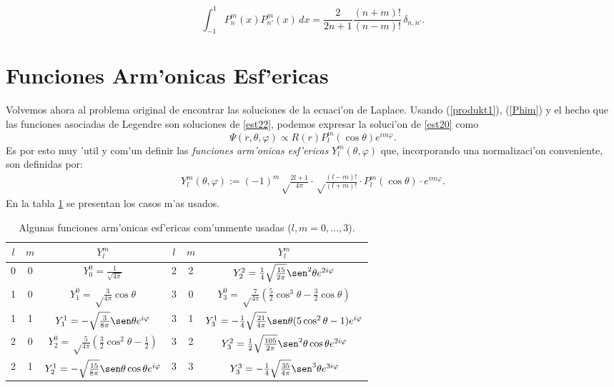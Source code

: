 \begin{equation}
\int_{-1}^{1}P_{n}^m(x)P_{n'}^m(x)\,dx=\frac{2}{2n+1}\frac{(n+m)!}{(n-m)!}\,\delta_{n,n'}.
\end{equation}



\section{Funciones Arm'onicas Esf'ericas}

 Volvemos ahora al problema original de encontrar las soluciones de la ecuaci'on
de Laplace. Usando (\ref{produkt1}), (\ref{Phim}) y el hecho que las funciones asociadas de Legendre son soluciones de \eqref{est22}, podemos expresar la soluci'on de \eqref{est20} como
 \begin{equation}
\Psi(r,\theta,\varphi)\propto R(r)P_l^m(\cos\theta)e^{im\varphi}.\label{est30}
 \end{equation}
Es por esto muy 'util y com'un definir las \textit{funciones arm'onicas
esf'ericas} $Y_l^m (\theta,\varphi)$ que, incorporando una normalizaci'on conveniente, son definidas por:
 \begin{eqnarray}
  Y_l^m (\theta,\varphi) := (-1)^m\sqrt\frac{2l+1}{4\pi}\cdot\sqrt\frac
   {(l-m)!}{(l+m)!}\cdot P_l^m(\cos\theta)\cdot e^{im\varphi}.\label{kugel1}
 \end{eqnarray}
  En la tabla \ref{tabelle1} se presentan los casos m'as usados.
\begin{table}[htbp]
\begin{tabular}{cc|c||cc|c}
  $l$ & $m$ & $Y_l^m $ & $l$ & $m$ & $Y_l^m $\\\hline
  0&0&$Y_0^0=\frac 1{\sqrt{4\pi}}$&2&2&$Y_2^2=\frac 14\sqrt\frac{15}{2\pi}
   \sen^2\theta e^{2i\varphi}$\\
  1&0&$Y_1^0=\sqrt\frac 3{4\pi}\cos\theta$&3&0&$Y_3^0=\sqrt\frac 7{4\pi}
  (\frac 52\cos^3\theta-\frac 32\cos\theta)$\\
  1&1&$Y_1^1=-\sqrt \frac 3{8\pi}\sen\theta e^{i\varphi}$&3&1&$Y_3^1=
  -\frac 14\sqrt\frac{21}{4\pi}\sen\theta(5\cos^2\theta-1)e^{i\varphi}$\\
  2&0&$Y_2^0=\sqrt\frac 5{4\pi}(\frac 32\cos^2\theta-\frac 12)$&3&2&$Y_3^2=
  \frac 12\sqrt\frac{105}{2\pi}\sen^2\theta\cos\theta e^{2i\varphi}$\\
  2&1&$Y_2^1=-\sqrt\frac{15}{8\pi}\sen\theta\cos\theta e^{i\varphi}$&3&3&$
  Y_3^3=-\frac 14\sqrt\frac{35}{4\pi}\sen^3\theta e^{3i\varphi}$
 \end{tabular}
\caption{Algunas funciones arm'onicas esf'ericas com'unmente usadas
($l,m=0,\ldots,3$).}
\label{tabelle1}
\end{table}

